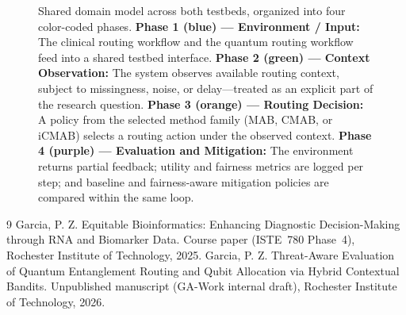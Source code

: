\documentclass{IEEEtran}
\begin{document}
\begin{figure}[!b]
{%
}
\caption{%
  Shared domain model across both testbeds, organized into four color-coded
  phases.
  \textcolor{phase1blue}{\textbf{Phase 1 (blue) --- Environment / Input:}}
    The clinical routing workflow and the quantum routing workflow feed into a
    shared testbed interface.
  \textcolor{phase2green}{\textbf{Phase 2 (green) --- Context Observation:}}
    The system observes available routing context, subject to missingness,
    noise, or delay---treated as an explicit part of the research question.
  \textcolor{phase3orange}{\textbf{Phase 3 (orange) --- Routing Decision:}}
    A policy from the selected method family (MAB, CMAB, or iCMAB) selects a
    routing action under the observed context.
  \textcolor{phase4purple}{\textbf{Phase 4 (purple) --- Evaluation and
    Mitigation:}}
    The environment returns partial feedback; utility and fairness metrics
    are logged per step; and baseline and fairness-aware mitigation policies
    are compared within the same loop.}
\label{fig:domain_model}
\end{figure}

\begin{thebibliography}{9}\setlength{\itemsep}{0em}
Garcia, P. Z. Equitable Bioinformatics: Enhancing Diagnostic
Decision-Making through {RNA} and Biomarker Data. Course paper
(ISTE~780 Phase~4), Rochester Institute of Technology, 2025.
Garcia, P. Z. Threat-Aware Evaluation of Quantum Entanglement Routing
and Qubit Allocation via Hybrid Contextual Bandits. Unpublished
manuscript (GA-Work internal draft), Rochester Institute of Technology,
2026.
\end{thebibliography}
\end{document}

